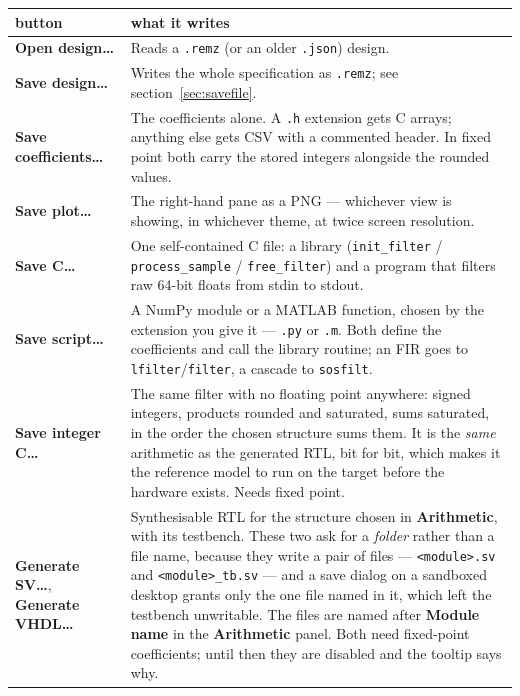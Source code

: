 \documentclass[11pt,a4paper]{article}
\newcommand{\ctl}[1]{\textbf{#1}}
\newcommand{\lit}[1]{\texttt{#1}}
\begin{document}
\begin{tabularx}{\textwidth}{@{}lY@{}}
  \toprule
  \textbf{button} & \textbf{what it writes} \\
  \midrule
  \ctl{Open design\dots} & Reads a \lit{.remz} (or an older \lit{.json})
    design. \\
  \addlinespace
  \ctl{Save design\dots} & Writes the whole specification as \lit{.remz}; see
    section~\ref{sec:savefile}. \\
  \addlinespace
  \ctl{Save coefficients\dots} & The coefficients alone. A \lit{.h} extension
    gets C arrays; anything else gets CSV with a commented header. In fixed
    point both carry the stored integers alongside the rounded values. \\
  \addlinespace
  \ctl{Save plot\dots} & The right-hand pane as a PNG --- whichever view is
    showing, in whichever theme, at twice screen resolution. \\
  \addlinespace
  \ctl{Save C\dots} & One self-contained C file: a library
    (\lit{init\_filter} / \lit{process\_sample} / \lit{free\_filter}) and a
    program that filters raw 64-bit floats from stdin to stdout. \\
  \addlinespace
  \ctl{Save script\dots} & A NumPy module or a MATLAB function, chosen by the
    extension you give it --- \lit{.py} or \lit{.m}. Both define the
    coefficients and call the library routine; an FIR goes to
    \lit{lfilter}/\lit{filter}, a cascade to \lit{sosfilt}. \\
  \addlinespace
  \ctl{Save integer C\dots} & The same filter with no floating point anywhere:
    signed integers, products rounded and saturated, sums saturated, in the
    order the chosen structure sums them. It is the \emph{same} arithmetic as
    the generated RTL, bit for bit, which makes it the reference model to run on
    the target before the hardware exists. Needs fixed point. \\
  \addlinespace
  \ctl{Generate SV\dots}, \ctl{Generate VHDL\dots} & Synthesisable RTL for the
    structure chosen in \ctl{Arithmetic}, with its testbench. These two ask for
    a \emph{folder} rather than a file name, because they write a pair of files
    --- \lit{<module>.sv} and \lit{<module>\_tb.sv} --- and a save dialog on a
    sandboxed desktop grants only the one file named in it, which left the
    testbench unwritable. The files are named after \ctl{Module name} in the
    \ctl{Arithmetic} panel. Both need fixed-point coefficients; until then they
    are disabled and the tooltip says why. \\
  \bottomrule
\end{tabularx}
\end{document}
